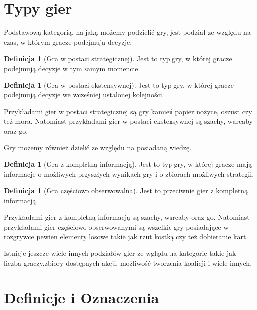 \documentclass[inzynierska]{pwr_wmat_praca_dyplomowa}
\theoremstyle{plain}
\numberwithin{theorem}{chapter}
\theoremstyle{definition}
\numberwithin{theorem}{chapter}
\newtheorem{definition}[theorem]{Definicja}
\begin{document}
\section{Typy gier }
Podstawową kategorią, na jaką możemy podzielić gry, jest podział ze względu na czas, w którym gracze podejmują decyzje:
\begin{definition}[Gra w postaci strategicznej]
Jest to typ gry, w której gracze podejmują decyzje w tym samym
momencie.
\end{definition}
\begin{definition}[Gra w postaci ekstensywnej]
	Jest to typ gry, w której gracze podejmują decyzje we wcześniej
	ustalonej kolejności.
\end{definition}
Przykładami gier w postaci strategicznej są gry kamień papier nożyce, oszust czy też mora. Natomiast przykładami gier w postaci ekstensywnej są szachy, warcaby oraz go.

Gry możemy również dzielić ze względu na posiadaną wiedzę.
\begin{definition}[Gra z kompletną informacją]
	Jest to typ gry, w której gracze mają informacje o możliwych
	przyszłych wynikach gry i o zbiorach możliwych strategii.
\end{definition}
\begin{definition}[Gra częściowo obserwowalna]
	Jest to przeciwnie gier z kompletną informacją.
\end{definition}
Przykładami gier z kompletną informacją są szachy, warcaby oraz go.
Natomiast przykładami gier częściowo obserwowanymi są wszelkie gry posiadające w rozgrywce pewien elementy losowe takie jak rzut kostką czy też dobieranie kart. 

Istnieje jeszcze wiele innych podziałów gier ze wglądu na kategorie takie jak liczba graczy,zbiory dostępnych akcji, możliwość tworzenia koalicji i wiele innych.

\section{Definicje i Oznaczenia}
\end{document}
